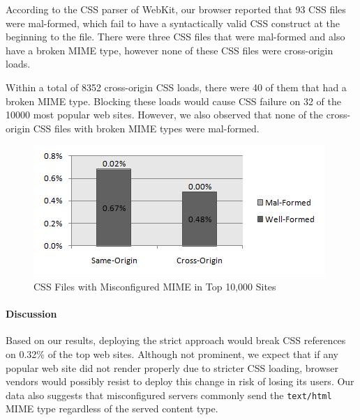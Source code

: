 \documentclass{acm_proc_article-sp}
\begin{document}
According to the CSS parser of WebKit, our browser reported that 93 CSS files were mal-formed, which fail to have a syntactically valid CSS construct at the beginning to the file. There were three CSS files that were mal-formed and also have a broken MIME type, however none of these CSS files were cross-origin loads.

Within a total of 8352 cross-origin CSS loads, there were 40 of them that had a broken MIME type. Blocking these loads would cause CSS failure on 32 of the 10000 most popular web sites. However, we also observed that none of the cross-origin CSS files with broken MIME types were mal-formed.


\begin{figure}
\centering
\includegraphics[width=\linewidth]{mime.jpg}
\caption{CSS Files with Misconfigured MIME in Top 10,000 Sites}
\label{table:MIME}
\end{figure}

\paragraph{Discussion}
Based on our results, deploying the strict approach would break CSS references on 0.32\% of the top web sites. Although not prominent, we expect that if any popular web site did not render properly due to stricter CSS loading, browser vendors would possibly resist to deploy this change in risk of losing its users. Our data also suggests that misconfigured servers commonly send the \texttt{text/html} MIME type regardless of the served content type.
\end{document}
